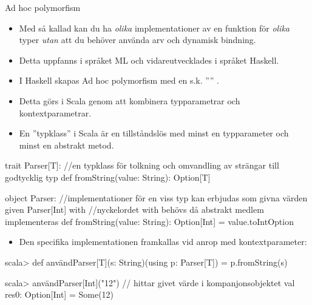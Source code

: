 \begin{Slide}{Ad hoc polymorfism}\SlideFontTiny
\begin{itemize}\SlideFontTiny
\item Med så kallad  kan du ha \emph{olika} implementationer av en funktion för \emph{olika} typer \emph{utan} att du behöver använda arv och dynamisk bindning. 
\item Detta uppfanns i språket ML och vidareutvecklades i språket Haskell.
\item I Haskell skapas Ad hoc polymorfism med en s.k. '''' . %
\item Detta görs i Scala genom att kombinera typparametrar och kontextparametrar.
\item En ''typklass'' i Scala är en tillståndslös  med minst en typparameter och minst en abstrakt metod.
\end{itemize}
\begin{CodeSmall}
trait Parser[T]: //en typklass för tolkning och omvandling av strängar till godtycklig typ 
  def fromString(value: String): Option[T]

object Parser:            //implementationer för en viss typ kan erbjudas som givna värden
  given Parser[Int] with        //nyckelordet with behövs då abstrakt medlem implementeras
    def fromString(value: String): Option[Int] = value.toIntOption   
\end{CodeSmall}
\begin{itemize}\SlideFontTiny
\item Den specifika implementationen framkallas vid anrop med kontextparameter:
\end{itemize}
\begin{REPLsmall}
scala> def användParser[T](s: String)(using p: Parser[T]) = p.fromString(s)

scala> användParser[Int]("12")        // hittar givet värde i kompanjonsobjektet
val res0: Option[Int] = Some(12)
\end{REPLsmall}
\end{Slide}

